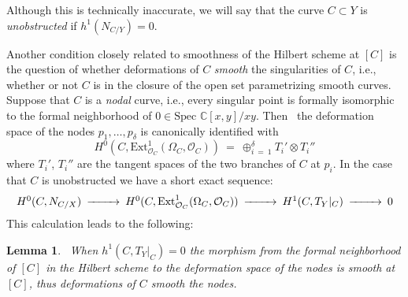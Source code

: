 \documentclass[twoside,12pt,reqno]{amsart}
\theoremstyle{plain}
\newtheorem{lem}[thm]{Lemma}
\theoremstyle{definition}
\newcommand{\CC}{\mathbb{C}}
\newcommand{\SP}{\text{Spec }}
\def\ps{\vspace{4pt}}
\newcommand{\OO}{\mathcal O}
\begin{document}
Although this is technically inaccurate, we will say that the curve
$C\subset Y$ is \emph{unobstructed} if $h^1(N_{C/Y})=0$.  

\ps

Another condition closely related to smoothness of the Hilbert scheme
at $[C]$ is the question of whether deformations of $C$ \emph{smooth}
the singularities of $C$, i.e., whether or not $C$ is in the closure of
the open set parametrizing smooth curves.  Suppose that $C$ is a
\emph{nodal} curve, i.e., every singular point is formally isomorphic
to the formal neighborhood of $0\in\SP\CC[x,y]/xy$.  Then~\cite[lemma
9.2.2]{CK}  the deformation space of the nodes
$p_1,\dots,p_{\delta}$ is canonically identified with 
\begin{equation}
H^0(C,\text{Ext}^1_{\OO_C}(\Omega_C,\OO_C))~=~\oplus_{i~=~1}^\delta
T_i'\otimes T_i''
\end{equation}
where $T_i'$, $T_i''$ are the tangent spaces of the two branches of $C$
at $p_i$.  In the case that $C$ is unobstructed we have a short exact
sequence:
\begin{equation}\label{eqn-def0}\begin{CD}
H^0(C,N_{C/X}) @>>> H^0(C,\text{Ext}^1_{\OO_C}(\Omega_C,\OO_C)) @>>>
H^1(C,T_Y|_C) @>>> 0
\end{CD}\end{equation}
This calculation leads to the following:

\ps

\begin{lem}~\label{lem-def1}
When $h^1(C,T_Y|_C)=0$ the morphism from the formal neighborhood of $[C]$
in the Hilbert scheme to the deformation space of the
nodes is smooth at $[C]$, thus deformations of $C$ smooth the nodes.
\end{lem}

\ps
\end{document}
